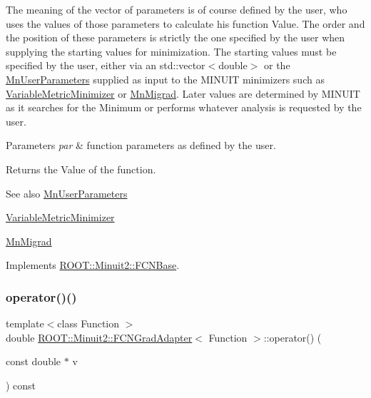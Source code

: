 The meaning of the vector of parameters is of course defined by the user, who uses the values of those parameters to calculate his function Value. The order and the position of these parameters is strictly the one specified by the user when supplying the starting values for minimization. The starting values must be specified by the user, either via an std\+::vector$<$double$>$ or the \mbox{\hyperlink{classROOT_1_1Minuit2_1_1MnUserParameters}{Mn\+User\+Parameters}} supplied as input to the M\+I\+N\+U\+IT minimizers such as \mbox{\hyperlink{classROOT_1_1Minuit2_1_1VariableMetricMinimizer}{Variable\+Metric\+Minimizer}} or \mbox{\hyperlink{classROOT_1_1Minuit2_1_1MnMigrad}{Mn\+Migrad}}. Later values are determined by M\+I\+N\+U\+IT as it searches for the Minimum or performs whatever analysis is requested by the user.


\begin{DoxyParams}{Parameters}
{\em par} & function parameters as defined by the user.\\
\hline
\end{DoxyParams}
\begin{DoxyReturn}{Returns}
the Value of the function.
\end{DoxyReturn}
\begin{DoxySeeAlso}{See also}
\mbox{\hyperlink{classROOT_1_1Minuit2_1_1MnUserParameters}{Mn\+User\+Parameters}} 

\mbox{\hyperlink{classROOT_1_1Minuit2_1_1VariableMetricMinimizer}{Variable\+Metric\+Minimizer}} 

\mbox{\hyperlink{classROOT_1_1Minuit2_1_1MnMigrad}{Mn\+Migrad}} 
\end{DoxySeeAlso}


Implements \mbox{\hyperlink{classROOT_1_1Minuit2_1_1FCNBase_ae4a86bd94d0d0f5ca6fc8f8ab2bb43cd}{R\+O\+O\+T\+::\+Minuit2\+::\+F\+C\+N\+Base}}.

\mbox{\label{classROOT_1_1Minuit2_1_1FCNGradAdapter_a3e3916bd20059d8e4a3f4938864ac2d7}} 
\subsubsection{\texorpdfstring{operator()()}{operator()()}\hspace{0.1cm}{\footnotesize\ttfamily [3/4]}}
{\footnotesize\ttfamily template$<$class Function $>$ \\
double \mbox{\hyperlink{classROOT_1_1Minuit2_1_1FCNGradAdapter}{R\+O\+O\+T\+::\+Minuit2\+::\+F\+C\+N\+Grad\+Adapter}}$<$ Function $>$\+::operator() (\begin{DoxyParamCaption}\item[{const double $\ast$}]{v }\end{DoxyParamCaption}) const\hspace{0.3cm}{\ttfamily [inline]}}

